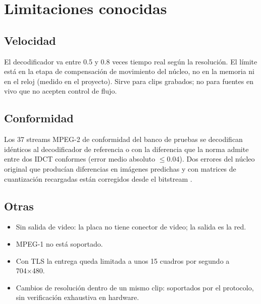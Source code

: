 \chapter{Limitaciones conocidas}\label{cap:limitaciones}

\section{Velocidad}

El decodificador va entre 0.5 y 0.8 veces tiempo real según la resolución.
El límite está en la etapa de compensación de movimiento del núcleo, no en la
memoria ni en el reloj (medido en el proyecto). Sirve para clips grabados; no
para fuentes en vivo que no acepten control de flujo.

\section{Conformidad}

Los 37 streams MPEG-2 de conformidad del banco de pruebas se decodifican
idénticos al decodificador de referencia o con la diferencia que la norma
admite entre dos IDCT conformes (error medio absoluto $\leq 0.04$). Dos
errores del núcleo original que producían diferencias en imágenes predichas y
con matrices de cuantización recargadas están corregidos desde el bitstream
.

\section{Otras}

\begin{itemize}
  \item Sin salida de video: la placa no tiene conector de video; la salida es
    la red.
  \item MPEG-1 no está soportado.
  \item Con TLS la entrega queda limitada a unos 15 cuadros por segundo a
    704×480.
  \item Cambios de resolución dentro de un mismo clip: soportados por el
    protocolo, sin verificación exhaustiva en hardware.
\end{itemize}

